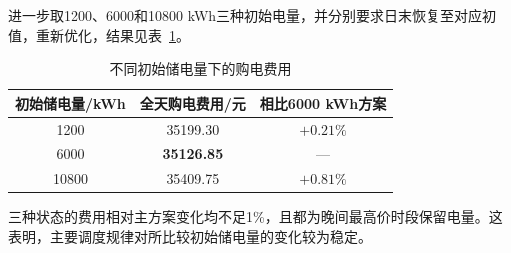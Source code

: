 进一步取1200、6000和10800 kWh三种初始电量，并分别要求日末恢复至对应初值，重新优化，结果见表~\ref{tab:q1_sensitivity}。
\begin{table}[H]
    \centering
    \caption{不同初始储电量下的购电费用}
    \label{tab:q1_sensitivity}
    \begin{tabular}{ccc}
        \toprule
        初始储电量/kWh & 全天购电费用/元 & 相比6000 kWh方案 \\
        \midrule
        1200 & 35199.30 & $+0.21\%$ \\
        6000 & \textbf{35126.85} & --- \\
        10800 & 35409.75 & $+0.81\%$ \\
        \bottomrule
    \end{tabular}
\end{table}
三种状态的费用相对主方案变化均不足1\%，且都为晚间最高价时段保留电量。这表明，主要调度规律对所比较初始储电量的变化较为稳定。
